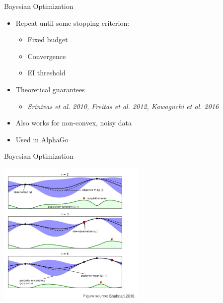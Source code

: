 \documentclass[aspectratio=169,t,handout,xcolor={usenames,dvipsnames}]{beamer}
\begin{document}
\begin{frame}{Bayesian Optimization}

\begin{itemize}
    \item Repeat until some stopping criterion:
        \begin{itemize}
            \item Fixed budget
            \item Convergence
            \item EI threshold
        \end{itemize}
    \item Theoretical guarantees 
        \begin{itemize}
            \item \textit{Srinivas et al. 2010, Freitas et al. 2012, Kawaguchi et al. 2016}
        \end{itemize}
    \item Also works for non-convex, noisy data
    \item Used in AlphaGo
\end{itemize}

\end{frame}
\begin{frame}{Bayesian Optimization}

\centering\includegraphics[height=7cm]{image/Jietu20220328-202037.jpg}


\end{frame}
\end{document}
